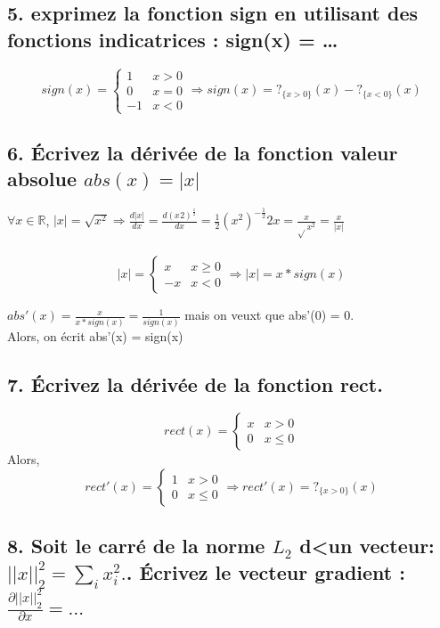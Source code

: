 \documentclass[12pt]{article}
\begin{document}
\subsection{5. exprimez la fonction sign en utilisant des fonctions indicatrices : sign(x) = \dots}

\[ 
sign(x) = 
\begin{cases} 
      1 &  x > 0 \\
      0 &  x = 0 \\
      -1 &  x < 0 
   \end{cases}
\Rightarrow sign(x) = ?_{\{x > 0\}}(x) - ?_{\{x < 0\}}(x)
\]

\subsection{6. Écrivez la dérivée de la fonction valeur absolue $abs(x) = |x|$}

$\forall x \in \mathbb{R}$,    $|x| = \sqrt{x^{2}} \Rightarrow \frac{d|x|}{dx} = \frac{d(x^{}2)^{\frac{1}{2}}}{dx} = \frac{1}{2}(x^{2})^{-\frac{1}{2}}2x = \frac{x}{\sqrt{}x^{2}} = \frac{x}{|x|}$ \\
\\
\[ 
|x| = 
\begin{cases} 
      x &  x \geq 0 \\
      -x &  x < 0 
   \end{cases}
\Rightarrow |x| = x*sign(x)
\]

$abs'(x) = \frac{x}{x*sign(x)} = \frac{1}{sign(x)}$ mais on veuxt que abs'(0) = 0. \\
Alors, on écrit abs'(x) = sign(x)

\subsection{7. Écrivez la dérivée de la fonction rect.}
\[ 
rect(x) = 
\begin{cases} 
      x &  x > 0 \\
     0 &  x \leq 0 
   \end{cases}
\]
Alors,
\[ 
rect'(x) = 
\begin{cases} 
     1 &  x > 0 \\
     0 &  x \leq 0 
   \end{cases}
\Rightarrow rect'(x) = ?_{\{x > 0\}}(x)
\]

\subsection{8. Soit le carré de la norme $L_{2}$ d<un vecteur: $||x||_{2}^{2}= \sum_{i}x_{i}^{2}.$. Écrivez le vecteur gradient : $\frac{\partial||x||_{2}^{2}}{\partial x} = \dots$}
\end{document}
